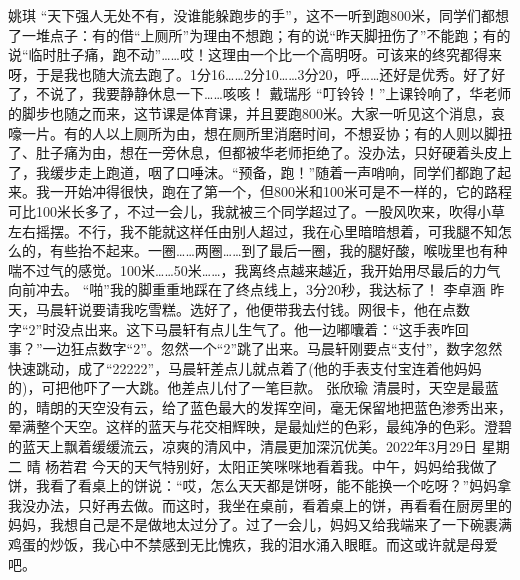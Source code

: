 {}\markdownRendererInterblockSeparator
{}姚琪\markdownRendererInterblockSeparator
{}“天下强人无处不有，没谁能躲跑步的手”，这不一听到跑800米，同学们都想了一堆点子：有的借“上厕所”为理由不想跑；有的说“昨天脚扭伤了”不能跑；有的说“临时肚子痛，跑不动”……哎！这理由一个比一个高明呀。可该来的终究都得来呀，于是我也随大流去跑了。1分16……2分10……3分20，呼……还好是优秀。好了好了，不说了，我要静静休息一下……咳咳！\markdownRendererInterblockSeparator
{}\markdownRendererInterblockSeparator
{}戴瑞彤\markdownRendererInterblockSeparator
{}“叮铃铃！”上课铃响了，华老师的脚步也随之而来，这节课是体育课，并且要跑800米。大家一听见这个消息，哀嚎一片。有的人以上厕所为由，想在厕所里消磨时间，不想妥协；有的人则以脚扭了、肚子痛为由，想在一旁休息，但都被华老师拒绝了。没办法，只好硬着头皮上了，我缓步走上跑道，咽了口唾沫。“预备，跑！”随着一声哨响，同学们都跑了起来。我一开始冲得很快，跑在了第一个，但800米和100米可是不一样的，它的路程可比100米长多了，不过一会儿，我就被三个同学超过了。一股风吹来，吹得小草左右摇摆。不行，我不能就这样任由别人超过，我在心里暗暗想着，可我腿不知怎么的，有些抬不起来。一圈……两圈……到了最后一圈，我的腿好酸，喉咙里也有种喘不过气的感觉。100米……50米……，我离终点越来越近，我开始用尽最后的力气向前冲去。\markdownRendererInterblockSeparator
{}“啪”我的脚重重地踩在了终点线上，3分20秒，我达标了！\markdownRendererInterblockSeparator
{}\markdownRendererInterblockSeparator
{}李卓涵\markdownRendererInterblockSeparator
{}昨天，马晨轩说要请我吃雪糕。选好了，他便带我去付钱。网很卡，他在点数字“2”时没点出来。这下马晨轩有点儿生气了。他一边嘟囔着：“这手表咋回事？”一边狂点数字“2”。忽然一个“2”跳了出来。马晨轩刚要点“支付”，数字忽然快速跳动，成了“22222”，马晨轩差点儿就点着了(他的手表支付宝连着他妈妈的)，可把他吓了一大跳。他差点儿付了一笔巨款。\markdownRendererInterblockSeparator
{}\markdownRendererInterblockSeparator
{}张欣瑜\markdownRendererInterblockSeparator
{}清晨时，天空是最蓝的，晴朗的天空没有云，给了蓝色最大的发挥空间，毫无保留地把蓝色渗秀出来，晕满整个天空。这样的蓝天与花交相辉映，是最灿烂的色彩，最纯净的色彩。澄碧的蓝天上飘着缓缓流云，凉爽的清风中，清晨更加深沉优美。2022年3月29日 星期二 晴\markdownRendererInterblockSeparator
{}\markdownRendererInterblockSeparator
{}杨若君\markdownRendererInterblockSeparator
{}今天的天气特别好，太阳正笑咪咪地看着我。中午，妈妈给我做了饼，我看了看桌上的饼说：“哎，怎么天天都是饼呀，能不能换一个吃呀？”妈妈拿我没办法，只好再去做。而这时，我坐在桌前，看着桌上的饼，再看看在厨房里的妈妈，我想自己是不是做地太过分了。过了一会儿，妈妈又给我端来了一下碗裹满鸡蛋的炒饭，我心中不禁感到无比愧疚，我的泪水涌入眼眶。而这或许就是母爱吧。\markdownRendererInterblockSeparator
